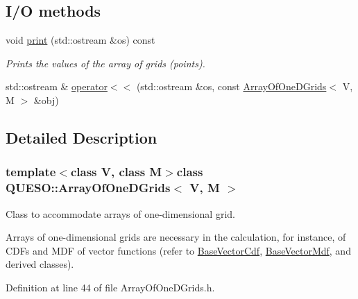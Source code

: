 \subsection*{I/\-O methods}
\begin{DoxyCompactItemize}
\item 
void \hyperlink{class_q_u_e_s_o_1_1_array_of_one_d_grids_a2c9eb92727869d6f985ed01c4a6d833d}{print} (std\-::ostream \&os) const 
\begin{DoxyCompactList}\small\item\em Prints the values of the array of grids (points). \end{DoxyCompactList}\item 
std\-::ostream \& \hyperlink{class_q_u_e_s_o_1_1_array_of_one_d_grids_af1bc76a10219d37cae967bf8f6d9859a}{operator$<$$<$} (std\-::ostream \&os, const \hyperlink{class_q_u_e_s_o_1_1_array_of_one_d_grids}{Array\-Of\-One\-D\-Grids}$<$ V, M $>$ \&obj)
\end{DoxyCompactItemize}


\subsection{Detailed Description}
\subsubsection*{template$<$class V, class M$>$class Q\-U\-E\-S\-O\-::\-Array\-Of\-One\-D\-Grids$<$ V, M $>$}

Class to accommodate arrays of one-\/dimensional grid. 

Arrays of one-\/dimensional grids are necessary in the calculation, for instance, of C\-D\-Fs and M\-D\-F of vector functions (refer to \hyperlink{class_q_u_e_s_o_1_1_base_vector_cdf}{Base\-Vector\-Cdf}, \hyperlink{class_q_u_e_s_o_1_1_base_vector_mdf}{Base\-Vector\-Mdf}, and derived classes). 

Definition at line 44 of file Array\-Of\-One\-D\-Grids.\-h.



